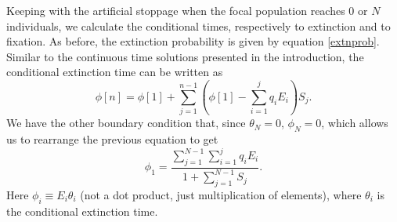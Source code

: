 Keeping with the artificial stoppage when the focal population reaches $0$ or $N$ individuals, we calculate the conditional times, respectively to extinction and to fixation. 
As before, the extinction probability is given by equation \ref{extnprob}. 
Similar to the continuous time solutions presented in the introduction,%
the conditional extinction time can be written as
\begin{equation}
\phi[n] = \phi[1] + \sum_{j=1}^{n-1}\left(\phi[1] - \sum_{i=1}^{j}q_iE_i\right)S_{j}.  
\end{equation}
We have the other boundary condition that, since $\theta_N = 0$, $\phi_N = 0$, which allows us to rearrange the previous equation to get
\begin{equation}
\phi_1 = \frac{\sum_{j=1}^{N-1}\sum_{i=1}^{j}q_iE_i}{1+\sum_{j=1}^{N-1}S_j}. 
\end{equation}
Here $\phi_i \equiv E_i \theta_i$ (not a dot product, just multiplication of elements), where $\theta_i$ is the conditional extinction time. 
